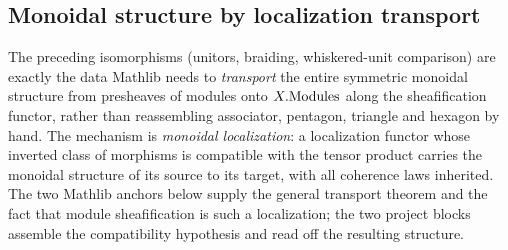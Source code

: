 \subsection{Monoidal structure by localization transport}
\label{subsec:sgr_monoidal_localization}

The preceding isomorphisms (unitors, braiding, whiskered-unit comparison) are
exactly the data Mathlib needs to \emph{transport} the entire symmetric monoidal
structure from presheaves of modules onto \(X.\mathrm{Modules}\) along the sheafification
functor, rather than reassembling associator, pentagon, triangle and hexagon by
hand. The mechanism is \emph{monoidal localization}: a localization functor whose
inverted class of morphisms is compatible with the tensor product carries the
monoidal structure of its source to its target, with all coherence laws inherited.
The two Mathlib anchors below supply the general transport theorem and the fact
that module sheafification is such a localization; the two project blocks assemble
the compatibility hypothesis and read off the resulting structure.

